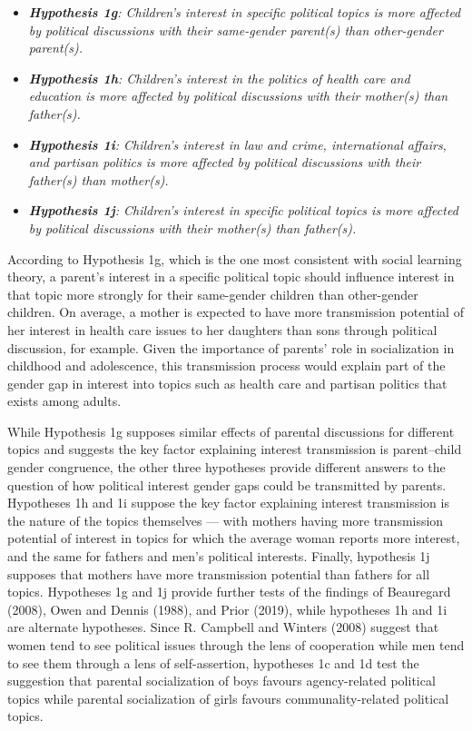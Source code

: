 \documentclass[
  letterpaper,
  DIV=11,
  numbers=noendperiod]{scrreprt}
\begin{document}
\begin{itemize}
\item
  \emph{\textbf{Hypothesis 1g}: Children's interest in specific
  political topics is more affected by political discussions with their
  same-gender parent(s) than other-gender parent(s).}
\item
  \emph{\textbf{Hypothesis 1h}: Children's interest in the politics of
  health care and education is more affected by political discussions
  with their mother(s) than father(s).}
\item
  \emph{\textbf{Hypothesis 1i}: Children's interest in law and crime,
  international affairs, and partisan politics is more affected by
  political discussions with their father(s) than mother(s).}
\item
  \emph{\textbf{Hypothesis 1j}: Children's interest in specific
  political topics is more affected by political discussions with their
  mother(s) than father(s).}
\end{itemize}

According to Hypothesis 1g, which is the one most consistent with social
learning theory, a parent's interest in a specific political topic
should influence interest in that topic more strongly for their
same-gender children than other-gender children. On average, a mother is
expected to have more transmission potential of her interest in health
care issues to her daughters than sons through political discussion, for
example. Given the importance of parents' role in socialization in
childhood and adolescence, this transmission process would explain part
of the gender gap in interest into topics such as health care and
partisan politics that exists among adults.

While Hypothesis 1g supposes similar effects of parental discussions for
different topics and suggests the key factor explaining interest
transmission is parent--child gender congruence, the other three
hypotheses provide different answers to the question of how political
interest gender gaps could be transmitted by parents. Hypotheses 1h and
1i suppose the key factor explaining interest transmission is the nature
of the topics themselves --- with mothers having more transmission
potential of interest in topics for which the average woman reports more
interest, and the same for fathers and men's political interests.
Finally, hypothesis 1j supposes that mothers have more transmission
potential than fathers for all topics. Hypotheses 1g and 1j provide
further tests of the findings of Beauregard (2008), Owen and Dennis
(1988), and Prior (2019), while hypotheses 1h and 1i are alternate
hypotheses. Since R. Campbell and Winters (2008) suggest that women tend
to see political issues through the lens of cooperation while men tend
to see them through a lens of self-assertion, hypotheses 1c and 1d test
the suggestion that parental socialization of boys favours
agency-related political topics while parental socialization of girls
favours communality-related political topics.
\end{document}
